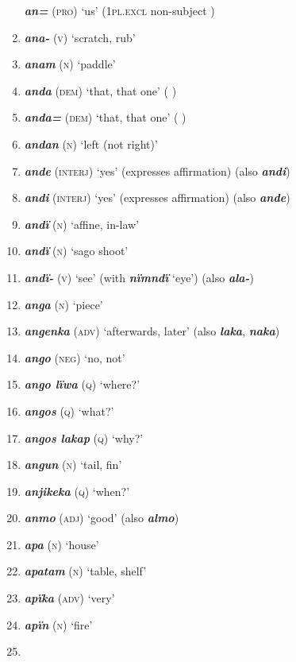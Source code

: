 \begin{enumerate}[noitemsep, label={}, align=left, widest=190, labelsep=1ex,leftmargin=*,itemindent=-10pt]
\textbf{\textit{an=}} (\textsc{pro)} ‘us’ (1\textsc{pl.excl} non-subject ) \item
\textbf{\textit{ana-}} (\textsc{v)} ‘scratch, rub’ \item
\textbf{\textit{anam}} (\textsc{n)} ‘paddle’ \item
\textbf{\textit{anda}} (\textsc{dem)} ‘that, that one’ (  ) \item
\textbf{\textit{anda=}} (\textsc{dem)} ‘that, that one’ (  ) \item
\textbf{\textit{andan}} (\textsc{n)} ‘left (not right)’ \item
\textbf{\textit{ande}} (\textsc{interj)} ‘yes’ (expresses affirmation) (also \textbf{\textit{andi}}) \item
\textbf{\textit{andi}} (\textsc{interj)} ‘yes’ (expresses affirmation) (also \textbf{\textit{ande}}) \item
\textbf{\textit{andï}} (\textsc{n)} ‘affine, in-law’ \item
\textbf{\textit{andï}} (\textsc{n)} ‘sago shoot’ \item
\textbf{\textit{andï-}} (\textsc{v}) ‘see’ (with \textbf{\textit{nïmndï}} ‘eye’) (also \textbf{\textit{ala-}}) \item
\textbf{\textit{anga}} (\textsc{n)} ‘piece’ \item
\textbf{\textit{angenka}} (\textsc{adv)} ‘afterwards, later’ (also \textbf{\textit{laka}}, \textbf{\textit{naka}}) \item
\textbf{\textit{ango}} (\textsc{neg)} ‘no, not’ \item
\textbf{\textit{ango lïwa}} (\textsc{q)} ‘where?’ \item
\textbf{\textit{angos}} (\textsc{q)} ‘what?’ \item
\textbf{\textit{angos lakap}} (\textsc{q)} ‘why?’ \item
\textbf{\textit{angun}} (\textsc{n)} ‘tail, fin’ \item
\textbf{\textit{anjikeka}} (\textsc{q)} ‘when?’ \item
\textbf{\textit{anmo}} (\textsc{adj)} ‘good’ (also \textbf{\textit{almo}}) \item
\textbf{\textit{apa}} (\textsc{n)} ‘house’ \item
\textbf{\textit{apatam}} (\textsc{n)} ‘table, shelf’ \item
\textbf{\textit{apïka}} (\textsc{adv)} ‘very’ \item
\textbf{\textit{apïn}} (\textsc{n)} ‘fire’ \item

\end{enumerate}
